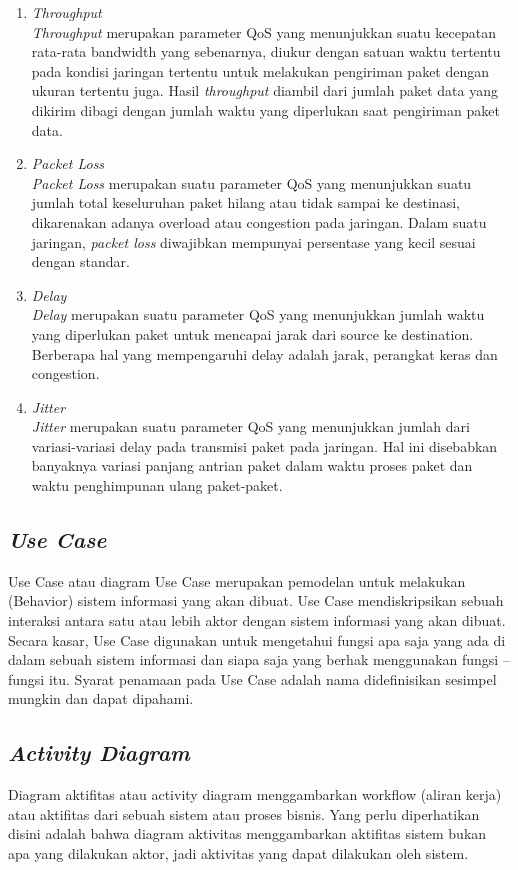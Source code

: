\begin{sloppypar}
\begin{enumerate}
	\item \textit{\textit{Throughput}} \\
	\textit{Throughput} merupakan parameter QoS yang 
menunjukkan suatu kecepatan rata-rata bandwidth
yang sebenarnya, diukur dengan satuan waktu 
tertentu pada kondisi jaringan tertentu untuk 
melakukan pengiriman paket dengan ukuran tertentu 
juga. Hasil \textit{throughput} diambil dari jumlah paket 
data yang dikirim dibagi dengan jumlah waktu yang 
diperlukan saat pengiriman paket data.
	\item \textit{Packet Loss} \\
	\textit{Packet Loss} merupakan suatu parameter QoS 
yang menunjukkan suatu jumlah total keseluruhan 
paket hilang atau tidak sampai ke destinasi, 
dikarenakan adanya overload atau congestion pada 
jaringan. Dalam suatu jaringan, \textit{packet loss}
diwajibkan mempunyai persentase yang kecil sesuai 
dengan standar. 
\item \textit{Delay} \\
\textit{Delay} merupakan suatu parameter QoS yang 
menunjukkan jumlah waktu yang diperlukan paket 
untuk mencapai jarak dari source ke destination. 
Berberapa hal yang mempengaruhi delay adalah 
jarak, perangkat keras dan congestion. 
\item \textit{Jitter}\\
\textit{Jitter} merupakan suatu parameter QoS yang 
menunjukkan jumlah dari variasi-variasi delay pada 
transmisi paket pada jaringan. Hal ini disebabkan 
banyaknya variasi panjang antrian paket dalam 
waktu proses paket dan waktu penghimpunan ulang 
paket-paket.

\end{enumerate}

\subsection{\textit{Use Case}}
\noindent

Use Case atau diagram Use Case merupakan 
pemodelan untuk melakukan (Behavior) sistem 
informasi yang akan dibuat. Use Case
mendiskripsikan sebuah interaksi antara satu 
atau lebih aktor dengan sistem informasi yang 
akan dibuat. Secara kasar, Use Case digunakan 
untuk mengetahui fungsi apa saja yang ada di 
dalam sebuah sistem informasi dan siapa saja 
yang berhak menggunakan fungsi – fungsi itu. 
Syarat penamaan pada Use Case adalah nama 
didefinisikan sesimpel mungkin dan dapat 
dipahami\cite{mandiri2013pembuatan}. 

\subsection{\textit{Activity Diagram}}
\noindent

Diagram aktifitas atau activity diagram
menggambarkan workflow (aliran kerja) atau 
aktifitas dari sebuah sistem atau proses bisnis. 
Yang perlu diperhatikan disini adalah bahwa 
diagram aktivitas menggambarkan aktifitas 
sistem bukan apa yang dilakukan aktor, jadi 
aktivitas yang dapat dilakukan oleh sistem\cite{mandiri2013pembuatan}.

\end{sloppypar}






